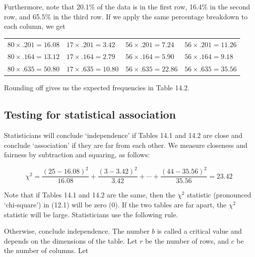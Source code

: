 \documentclass[11pt, chapterprefix=true]{scrbook}\usepackage[]{graphicx}\usepackage[]{color}
\begin{document}
Furthermore, note that 20.1\% of the data is in the first row, 16.4\% in the second row, and 65.5\% in the third row.  If we apply the same percentage breakdown to each column, we get

\begin{table}[ht]
\centering
\begin{tabular}{@{} llll @{}} \hline
$80 \times .201 = 16.08$ & $17 \times .201 = 3.42$ & $56 \times .201 = 7.24$ & $56 \times .201 = 11.26$  \\
$80 \times .164 = 13.12$ & $17 \times .164 = 2.79$ & $56 \times .164 = 5.90$ & $56 \times .164 = 9.18$  \\
$80 \times .635 = 50.80$ & $17 \times .635 = 10.80$ & $56 \times .635 = 22.86$ & $56 \times .635 = 35.56$  \\ \hline
\end{tabular}
\end{table}

Rounding off gives us the expected frequencies in Table 14.2.

\subsection{Testing for statistical association}

Statisticians will conclude `independence' if Tables 14.1 and 14.2 are close and conclude `association' if they are far from each other.    We measure closeness and fairness by subtraction and squaring, as follows:



\begin{equation*}
\chi^2 = \frac{(25-16.08)^2}{16.08} + \frac{(3-3.42)^2}{3.42} + \cdots + \frac{(44-35.56)^2}{35.56} = 23.42  
\end{equation*}

Note that if Tables 14.1 and 14.2 are the same, then the $\chi^2$ statistic (pronounced `chi-square') in (12.1) will be zero (0).  If the two tables are far apart, the $\chi^2$ statistic will be large.  Statisticians use the following rule. 

\begin{center}
\end{center}

Otherwise, conclude independence.  The number $b$ is called a critical value and depends on the dimensions of the table.  Let $r$ be the number of rows, and $c$ be the number of columns.  Let
\end{document}
